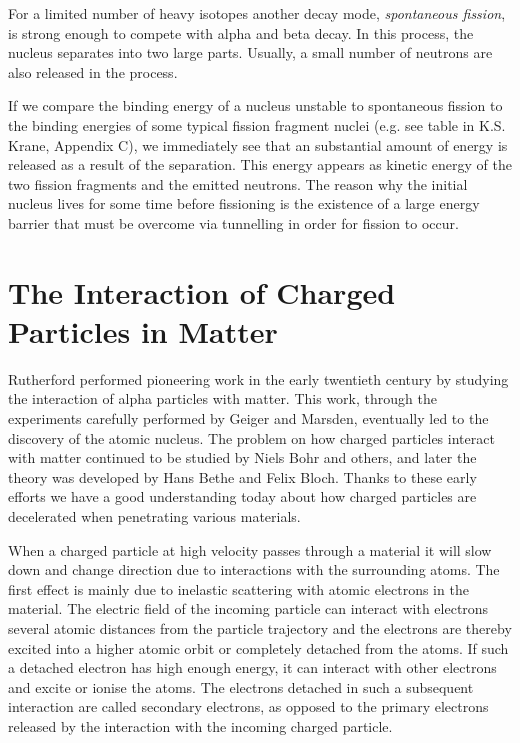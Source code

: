 \documentclass[12pt]{article}
\begin{document}
For a limited number of heavy isotopes another decay mode, \emph{spontaneous
fission}, is strong enough to compete with alpha and beta decay. In
this process, the nucleus separates into two large parts. Usually, a
small number of neutrons are also released in the process.

If we compare the binding energy of a nucleus unstable to spontaneous
fission to the binding energies of some typical fission fragment
nuclei (e.g. see table in K.S. Krane, Appendix C), we immediately see
that an substantial amount of energy is released as a result of the
separation. This energy appears as kinetic energy of the two fission
fragments and the emitted neutrons.  The reason why the initial
nucleus lives for some time before fissioning is the existence of a
large energy barrier that must be overcome via tunnelling in order
for fission to occur.

\section*{The Interaction of Charged Particles in Matter}

Rutherford performed pioneering work in the early twentieth century by
studying the interaction of alpha particles with matter. This work, through
the experiments carefully performed by Geiger and Marsden, eventually
led to the discovery of the atomic nucleus.  The problem on how
charged particles interact with matter continued to be studied by
Niels Bohr and others, and later the theory was developed by Hans
Bethe and Felix Bloch. Thanks to these early efforts we have a good
understanding today about how charged particles are decelerated when
penetrating various materials.

When a charged particle at high velocity passes through a material it
will slow down and change direction due to interactions with
the surrounding atoms.  The 
first effect is mainly due
to inelastic scattering with atomic electrons in the material. The
electric field of the incoming particle can interact with electrons
several atomic distances from the particle trajectory and the
electrons are thereby excited into a higher atomic orbit or
completely detached from the atoms. If such a detached electron has
high enough energy, it can interact with other electrons and excite or
ionise the atoms. The electrons detached in such a subsequent
interaction are called secondary electrons, as opposed to the primary
electrons released by the interaction with the incoming charged
particle.
\end{document}
